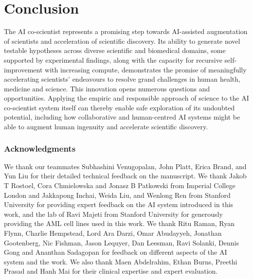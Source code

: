 \clearpage

\section{Conclusion}
The AI co-scientist represents a promising step towards AI-assisted augmentation of scientists and acceleration of scientific discovery. Its ability to generate novel testable hypotheses across diverse scientific and biomedical domains, some supported by experimental findings, along with the capacity for recursive self-improvement with increasing compute, demonstrates the promise of meaningfully accelerating scientists’ endeavours to resolve grand challenges in human health, medicine and science. This innovation opens numerous questions and opportunities. Applying the empiric and responsible approach of science to the AI co-scientist system itself can thereby enable safe exploration of its undoubted potential, including how collaborative and human-centred AI systems might be able to augment human ingenuity and accelerate scientific discovery.

\vspace{12pt}
\subsubsection*{Acknowledgments}
We thank our teammates Subhashini Venugopalan, John Platt, Erica Brand, and Yun Liu for their detailed technical feedback on the manuscript. We thank Jakob T Rostoel, Cora Chmielowska and Jonasz B Patkowski from Imperial College London and Jakkapong Inchai, Weida Liu, and Wenlong Ren from Stanford University for providing expert feedback on the AI system introduced in this work, and the lab of Ravi Majeti from Stanford University for generously providing the AML cell lines used in this work. We thank Ritu Raman, Ryan Flynn, Charlie Hempstead, Lord Ara Darzi, Omar Abudayyeh, Jonathan Gootenberg, Nic Fishman, Jason Lequyer, Dan Leesman, Ravi Solanki, Dennis Gong and Ananthan Sadagopan for feedback on different aspects of the AI system and the work. We also thank Maen Abdelrahim, Ethan Burns, Preethi Prasad and Hanh Mai for their clinical expertise and expert evaluation.

